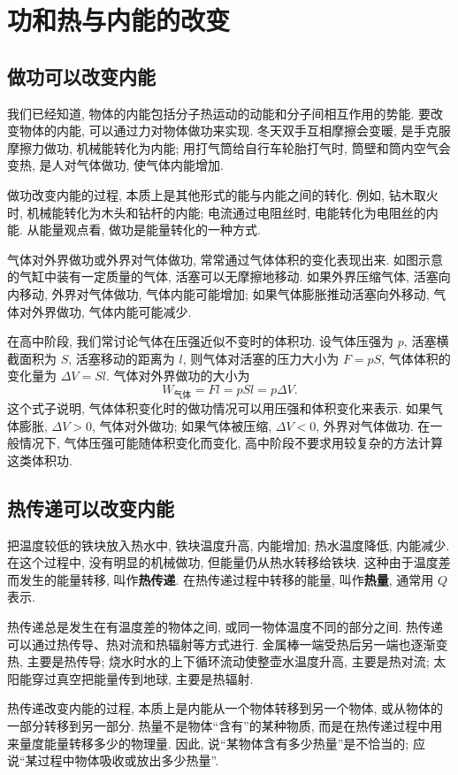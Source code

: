 \documentclass[UTF8,openany,fontset=fandol]{ctexbook}
\theoremstyle{chinesetextbook}
\begin{document}
\section{功和热与内能的改变}
\subsection{做功可以改变内能}
我们已经知道, 物体的内能包括分子热运动的动能和分子间相互作用的势能. 要改变物体的内能, 可以通过力对物体做功来实现. 冬天双手互相摩擦会变暖, 是手克服摩擦力做功, 机械能转化为内能; 用打气筒给自行车轮胎打气时, 筒壁和筒内空气会变热, 是人对气体做功, 使气体内能增加.

做功改变内能的过程, 本质上是其他形式的能与内能之间的转化. 例如, 钻木取火时, 机械能转化为木头和钻杆的内能; 电流通过电阻丝时, 电能转化为电阻丝的内能. 从能量观点看, 做功是能量转化的一种方式.

气体对外界做功或外界对气体做功, 常常通过气体体积的变化表现出来. 如图示意的气缸中装有一定质量的气体, 活塞可以无摩擦地移动. 如果外界压缩气体, 活塞向内移动, 外界对气体做功, 气体内能可能增加; 如果气体膨胀推动活塞向外移动, 气体对外界做功, 气体内能可能减少.

在高中阶段, 我们常讨论气体在压强近似不变时的体积功. 设气体压强为 $p$, 活塞横截面积为 $S$, 活塞移动的距离为 $l$, 则气体对活塞的压力大小为 $F=pS$, 气体体积的变化量为 $\Delta V=Sl$. 气体对外界做功的大小为
\[
W_\text{气体}=Fl=pS l=p\Delta V.
\]
这个式子说明, 气体体积变化时的做功情况可以用压强和体积变化来表示. 如果气体膨胀, $\Delta V>0$, 气体对外做功; 如果气体被压缩, $\Delta V<0$, 外界对气体做功. 在一般情况下, 气体压强可能随体积变化而变化, 高中阶段不要求用较复杂的方法计算这类体积功.
\subsection{热传递可以改变内能}
把温度较低的铁块放入热水中, 铁块温度升高, 内能增加; 热水温度降低, 内能减少. 在这个过程中, 没有明显的机械做功, 但能量仍从热水转移给铁块. 这种由于温度差而发生的能量转移, 叫作\textbf{热传递}. 在热传递过程中转移的能量, 叫作\textbf{热量}, 通常用 $Q$ 表示.

热传递总是发生在有温度差的物体之间, 或同一物体温度不同的部分之间. 热传递可以通过热传导、热对流和热辐射等方式进行. 金属棒一端受热后另一端也逐渐变热, 主要是热传导; 烧水时水的上下循环流动使整壶水温度升高, 主要是热对流; 太阳能穿过真空把能量传到地球, 主要是热辐射.

热传递改变内能的过程, 本质上是内能从一个物体转移到另一个物体, 或从物体的一部分转移到另一部分. 热量不是物体“含有”的某种物质, 而是在热传递过程中用来量度能量转移多少的物理量. 因此, 说“某物体含有多少热量”是不恰当的; 应说“某过程中物体吸收或放出多少热量”.
\end{document}
